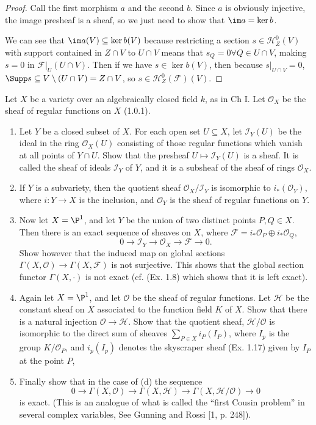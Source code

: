 \begin{proof}
	Call the first morphism $a $ and the second $b $.
	Since $a $ is obviously injective, the image presheaf is a sheaf, so we just need to show that $\im a = \ker b $.

	We can see that $\im a(V) \subseteq \ker b(V) $ because restricting a section $s \in \mathscr{H}_Z^0(V) $ with support contained in $Z\cap V $ to $U \cap V$ means that $s_Q = 0 \forall Q \in U\cap V $, making $s=0 $ in $\mathscr{F}|_U(U\cap V) $.
	Then if we have $s \in \ker b(V)$, then because $s|_{U\cap V}=0 $, $\Supp s \subseteq V \setminus (U\cap V) = Z\cap V$, so $s \in \mathscr{H}_Z^0(\mathscr{F})(V) $.
\end{proof}

\begin{exercise} %
	Let $X$ be a variety over an algebraically closed field $k$, as in Ch I. Let $\mathscr{O}_X $ be the sheaf of regular functions on $X$ (1.0.1). 
	\begin{enumerate}
		\item Let $Y$ be a closed subset of $X$. For each open set $U \subseteq X$, let $\mathscr{I}_Y(U)$ be the ideal in the ring $\mathscr{O}_X(U)$ consisting of those regular functions which vanish at all points of $Y \cap U$. Show that the presheaf $U \mapsto \mathscr{I}_Y(U)$ is a sheaf. It is called the sheaf of ideals $\mathscr{I}_Y$ of $Y$, and it is a subsheaf of the sheaf of rings $\mathscr{O}_X $.
		\item If $Y$ is a subvariety, then the quotient sheaf $\mathscr{O}_X/\mathscr{I}_Y$ is isomorphic to $i_\ast(\mathscr{O}_Y)$, where $i: Y \to X$ is the inclusion, and $\mathscr{O}_Y$ is the sheaf of regular functions on $Y$. 
		\item Now let $X = \P^1$, and let $Y$ be the union of two distinct points $P,Q \in X$. Then there is an exact sequence of sheaves on $X$, where $\mathscr{F} = i_\ast\mathscr{O}_P \oplus i_\ast\mathscr{O}_Q$, 
			\[
			0\to \mathscr{I}_Y \to \mathscr{O}_X \to \mathscr{F} \to 0. 
		\]
		Show however that the induced map on global sections $\Gamma(X,\mathscr{O}) \to \Gamma(X,\mathscr{F})$ is not surjective. This shows that the global section functor $\Gamma(X,\cdot)$ is not exact (cf. (Ex. 1.8) which shows that it is left exact). 
		\item Again let $X = \P^1$, and let $\mathscr{O}$ be the sheaf of regular functions. Let $\mathscr{H}$ be the constant sheaf on $X$ associated to the function field $K$ of $X$. Show that there is a natural injection $\mathscr{O} \to \mathscr{H}$. Show that the quotient sheaf, $\mathscr{H} / \mathscr{O}$ is isomorphic to the direct sum of sheaves $\sum_{P\in X} i_P(I_P) $, where $I_p$ is the group $K/\mathscr{O}_P$, and $i_p(I_p)$ denotes the skyscraper sheaf (Ex. 1.17) given by $I_P$ at the point $P$, 
		\item Finally show that in the case of (d) the sequence 
		\[
			0\to \Gamma(X,\mathscr{O}) \to \Gamma(X,\mathscr{H}) \to \Gamma(X,\mathscr{H}/\mathscr{O}) \to 0 
		\]
		is exact. (This is an analogue of what is called the ``first Cousin problem'' in several complex variables, See Gunning and Rossi [1, p. 248]).
	\end{enumerate}
\end{exercise}
